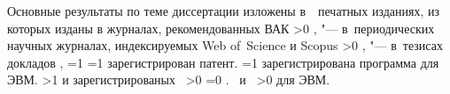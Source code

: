 {\begin{refsection}
        {\publications} Основные результаты по теме диссертации изложены в~~печатных изданиях,
         из которых изданы в журналах, рекомендованных ВАК%
        \ifnum \value{citeauthorscopuswos}>0%
            ,  "--- в~периодических научных журналах, индексируемых Web of~Science и Scopus%
        \fi%
        \ifnum \value{citeauthorconf}>0%
            ,  "--- в~тезисах докладов
        \else%
            ,
        \fi%
        \ifnum \value{citeregistered}=1%
            \ifnum \value{citeauthorpatent}=1%
                зарегистрирован  патент.
            \fi%
            \ifnum \value{citeauthorprogram}=1%
                зарегистрирована  программа для ЭВМ.
            \fi%
        \fi%
        \ifnum \value{citeregistered}>1%
            и зарегистрированых\ %
            \ifnum \value{citeauthorpatent}>0%
            \ifnum \value{citeauthorprogram}=0 . \else \ и~\fi%
            \fi%
            \ifnum \value{citeauthorprogram}>0%
             для ЭВМ.
            \fi%
        \fi%
    \end{refsection}%
    \begin{refsection}
    \end{refsection}%
}
